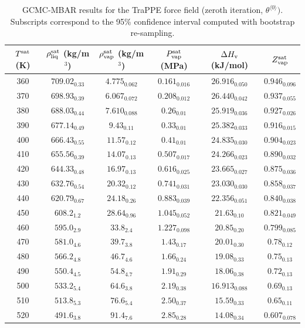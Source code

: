 \documentclass[journal=jctc,manuscript=article]{achemso}
\begin{document}
	\begin{table}[htb!]
		\caption{GCMC-MBAR results for the TraPPE force field (zeroth iteration, $\theta^{\langle0\rangle})$. Subscripts correspond to the 95\% confidence interval computed with bootstrap re-sampling.}
		\begin{center}
			\begin{tabular}{|c|c|c|c|c|c|}
				\hline
				$T^{\rm sat}$ (K) & $\rho_{\rm liq}^{\rm sat}$ (kg/m$^3$) & $\rho_{\rm vap}^{\rm sat}$ (kg/m$^3$) & $P_{\rm vap}^{\rm sat}$ (MPa) & $\Delta H_{\rm v}$ (kJ/mol) & $Z_{\rm vap}^{\rm sat}$ \\ \hline
				360 & $709.02_{0.33}$ & $4.775_{0.062}$ & $0.161_{0.016}$ & $26.916_{0.050}$ & $0.946_{0.096}$ \\
				370 & $698.93_{0.39}$ & $6.067_{0.072}$ & $0.208_{0.012}$ & $26.440_{0.042}$ & $0.937_{0.055}$ \\
				380 & $688.03_{0.44}$ & $7.610_{0.088}$ & $0.26_{0.01}$ & $25.919_{0.036}$ & $0.927_{0.026}$ \\
				390 & $677.14_{0.49}$ & $9.43_{0.11}$ & $0.33_{0.01}$ & $25.382_{0.033}$ & $0.916_{0.015}$ \\
				400 & $666.43_{0.55}$ & $11.57_{0.12}$ & $0.41_{0.01}$ & $24.835_{0.030}$ & $0.904_{0.023}$ \\
				410 & $655.56_{0.39}$ & $14.07_{0.13}$ & $0.507_{0.017}$ & $24.266_{0.023}$ & $0.890_{0.032}$ \\
				420 & $644.33_{0.48}$ & $16.97_{0.13}$ & $0.616_{0.025}$ & $23.665_{0.027}$ & $0.875_{0.036}$ \\
				430 & $632.76_{0.54}$ & $20.32_{0.12}$ & $0.741_{0.031}$ & $23.030_{0.030}$ & $0.858_{0.037}$ \\
				440 & $620.79_{0.67}$ & $24.18_{0.26}$ & $0.883_{0.039}$ & $22.356_{0.051}$ & $0.840_{0.038}$ \\
				450 & $608.2_{1.2}$ & $28.64_{0.96}$ & $1.045_{0.052}$ & $21.63_{0.10}$ & $0.821_{0.049}$ \\
				460 & $595.0_{2.9}$ & $33.8_{2.4}$ & $1.227_{0.098}$ & $20.85_{0.20}$ & $0.799_{0.085}$ \\
				470 & $581.0_{4.6}$ & $39.7_{3.8}$ & $1.43_{0.17}$ & $20.01_{0.30}$ & $0.78_{0.12}$ \\
				480 & $566.2_{4.8}$ & $46.7_{4.6}$ & $1.66_{0.24}$ & $19.08_{0.33}$ & $0.75_{0.13}$ \\
				490 & $550.4_{4.5}$ & $54.8_{4.7}$ & $1.91_{0.29}$ & $18.06_{0.38}$ & $0.72_{0.13}$ \\
				500 & $533.2_{5.4}$ & $64.6_{3.8}$ & $2.19_{0.38}$ & $16.913_{0.088}$ & $0.69_{0.13}$ \\
				510 & $513.8_{5.3}$ & $76.6_{5.4}$ & $2.50_{0.37}$ & $15.59_{0.33}$ & $0.65_{0.11}$ \\
				520 & $491.6_{3.8}$ & $91.4_{7.6}$ & $2.85_{0.28}$ & $14.08_{0.34}$ & $0.607_{0.078}$ \\
				\hline
			\end{tabular}
		\end{center}
	\end{table}
\end{document}
